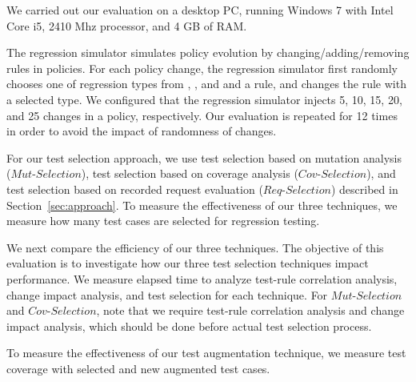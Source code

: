 We carried out our evaluation on a desktop PC, running Windows 7 with Intel Core i5, 2410 Mhz processor, and 4 GB of RAM. 

The regression simulator simulates policy evolution by changing/adding/removing rules in policies.
For each policy change, the regression simulator first randomly chooses one of regression types from , ,
and  and a rule, and changes the rule with a selected type.
We configured that the regression simulator injects 5, 10, 15, 20, and 25 changes in a policy, respectively.
Our evaluation is repeated for 12 times in order to avoid the impact of randomness of changes.

For our test selection approach, we use test selection based on mutation analysis ($Mut$-$Selection$),
test selection based on coverage analysis ($Cov$-$Selection$), and
test selection based on recorded request evaluation ($Req$-$Selection$)
described in Section~\ref{sec:approach}.
To measure the effectiveness of our three techniques,
we measure how many test cases are selected for regression testing.

We next compare the efficiency of our three techniques.
The objective of this evaluation is to investigate how our three test selection techniques impact performance.
We measure elapsed time to analyze test-rule correlation analysis,
change impact analysis, and test selection for each technique.
For $Mut$-$Selection$ and $Cov$-$Selection$, note that we require test-rule correlation analysis
and change impact analysis, which should be done before actual test selection process.

To measure the effectiveness of our test augmentation technique,
we measure test coverage with selected and new augmented test cases.




  
%
%

